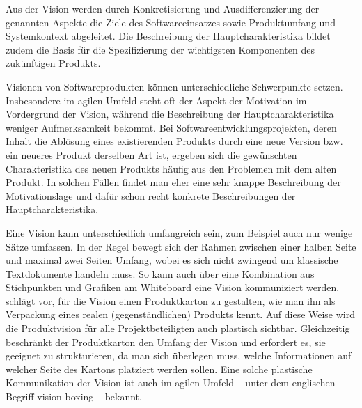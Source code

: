 Aus der Vision werden durch Konkretisierung und Ausdifferenzierung der genannten Aspekte die Ziele des Softwareeinsatzes sowie Produktumfang und Systemkontext abgeleitet. Die Beschreibung der Hauptcharakteristika bildet zudem die Basis für die Spezifizierung der wichtigsten Komponenten des zukünftigen Produkts.

Visionen von Softwareprodukten können unterschiedliche Schwerpunkte setzen. Insbesondere im agilen Umfeld steht oft der Aspekt der Motivation im Vordergrund der Vision, während die Beschreibung der Hauptcharakteristika weniger Aufmerksamkeit bekommt. Bei Softwareentwicklungsprojekten, deren Inhalt die Ablösung eines existierenden Produkts durch eine neue Version bzw. ein neueres Produkt derselben Art ist, ergeben sich die gewünschten Charakteristika des neuen Produkts häufig aus den Problemen mit dem alten Produkt. In solchen Fällen findet man eher eine sehr knappe Beschreibung der Motivationslage und dafür schon recht konkrete Beschreibungen der Hauptcharakteristika.

Eine Vision kann unterschiedlich umfangreich sein, zum Beispiel auch nur wenige Sätze umfassen. In der Regel bewegt sich der Rahmen zwischen einer halben Seite und maximal zwei Seiten Umfang,  wobei es sich nicht zwingend um klassische Textdokumente handeln muss. So kann auch über eine Kombination aus Stichpunkten und Grafiken am Whiteboard eine Vision kommuniziert werden. \cite[43 \psqq]{oes13} schlägt vor, für die Vision einen Produktkarton zu gestalten, wie man ihn als Verpackung eines realen (gegenständlichen) Produkts kennt. Auf diese Weise wird die Produktvision für alle Projektbeteiligten auch plastisch sichtbar. Gleichzeitig beschränkt der Produktkarton den Umfang der Vision und erfordert es, sie geeignet zu strukturieren, da man sich überlegen muss, welche Informationen auf welcher Seite des Kartons platziert werden sollen. Eine solche plastische Kommunikation der Vision ist auch im agilen Umfeld -- unter dem englischen Begriff vision boxing -- bekannt.

